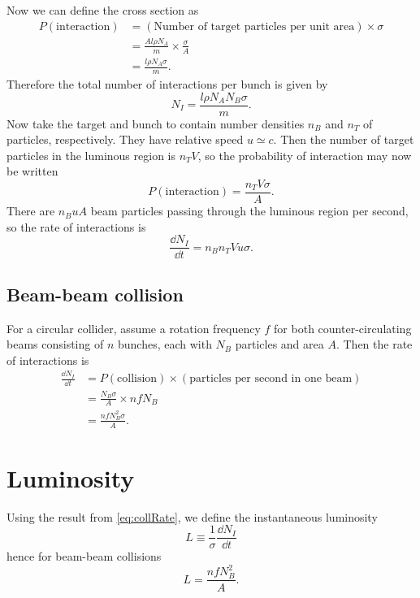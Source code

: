 Now we can define the cross section as
\begin{align}
P(\text{interaction}) &= (\text{Number of target particles per unit area}) \times \sigma \\
&= \frac{Al\rho N_A}{m} \times \frac{\sigma}{A} \nonumber \\
&= \frac{l\rho N_A \sigma}{m}.
\end{align}
Therefore the total number of interactions per bunch is given by
\begin{equation}
N_I = \frac{l\rho N_A N_B \sigma}{m}.
\end{equation}
Now take the target and bunch to contain number densities $n_B$ and $n_T$ of particles, respectively. They have relative speed $u \simeq c$. Then the number of target particles in the luminous region is $n_T V$, so the probability of interaction may now be written
\begin{equation}
P(\text{interaction}) = \frac{n_T V \sigma}{A}.
\end{equation}
There are $n_B u A$ beam particles passing through the luminous region per second, so the rate of interactions is
\begin{equation}
\frac{\dd N_I}{\dd t} = n_B n_T V u \sigma.
\end{equation}

\subsection{Beam-beam collision}
For a circular collider, assume a rotation frequency $f$ for both counter-circulating beams consisting of $n$ bunches, each with $N_B$ particles and area $A$. Then the rate of interactions is
\begin{align}
\frac{\dd N_I}{\dd t} &= P(\text{collision}) \times (\text{particles per second in one beam}) \\
&= \frac{N_B \sigma}{A} \times n f N_B \nonumber \\
&= \frac{n f N_B^2 \sigma}{A} \label{eq:collRate}.
\end{align}

\section{Luminosity}
Using the result from \eqref{eq:collRate}, we define the instantaneous luminosity
\begin{equation}\boxed{
L \equiv \frac{1}{\sigma} \frac{\dd N_I}{\dd t}
}\end{equation}
hence for beam-beam collisions
\begin{equation}
L = \frac{n f N_B^2}{A}.
\end{equation}

